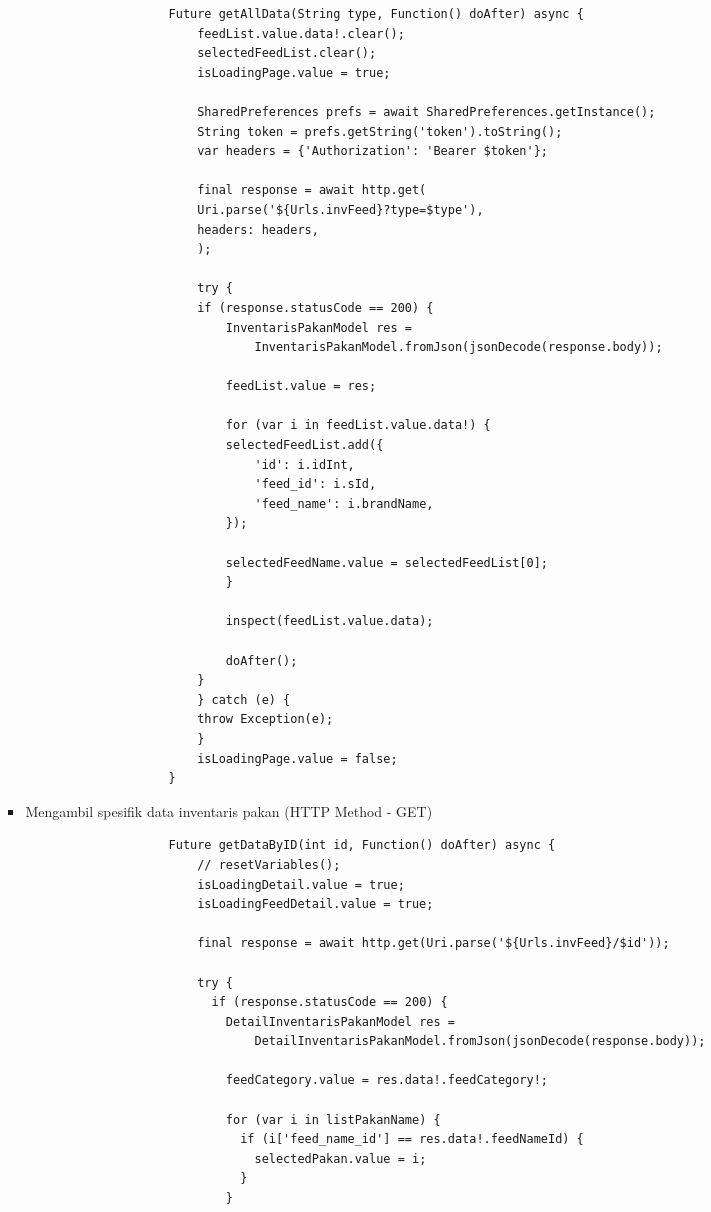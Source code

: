 \begin{spacing}{1.5}
\begin{enumerate}
\begin{enumerate}
\begin{itemize}
				\begin{lstlisting}
					Future getAllData(String type, Function() doAfter) async {
						feedList.value.data!.clear();
						selectedFeedList.clear();
						isLoadingPage.value = true;

						SharedPreferences prefs = await SharedPreferences.getInstance();
						String token = prefs.getString('token').toString();
						var headers = {'Authorization': 'Bearer $token'};

						final response = await http.get(
						Uri.parse('${Urls.invFeed}?type=$type'),
						headers: headers,
						);

						try {
						if (response.statusCode == 200) {
							InventarisPakanModel res =
								InventarisPakanModel.fromJson(jsonDecode(response.body));

							feedList.value = res;

							for (var i in feedList.value.data!) {
							selectedFeedList.add({
								'id': i.idInt,
								'feed_id': i.sId,
								'feed_name': i.brandName,
							});

							selectedFeedName.value = selectedFeedList[0];
							}

							inspect(feedList.value.data);

							doAfter();
						}
						} catch (e) {
						throw Exception(e);
						}
						isLoadingPage.value = false;
					}
				\end{lstlisting}

				\item Mengambil spesifik data inventaris pakan (HTTP Method - GET)
				
				\begin{lstlisting}
					Future getDataByID(int id, Function() doAfter) async {
						// resetVariables();
						isLoadingDetail.value = true;
						isLoadingFeedDetail.value = true;
					
						final response = await http.get(Uri.parse('${Urls.invFeed}/$id'));
					
						try {
						  if (response.statusCode == 200) {
							DetailInventarisPakanModel res =
								DetailInventarisPakanModel.fromJson(jsonDecode(response.body));
					
							feedCategory.value = res.data!.feedCategory!;
					
							for (var i in listPakanName) {
							  if (i['feed_name_id'] == res.data!.feedNameId) {
								selectedPakan.value = i;
							  }
							}
					

\end{lstlisting}
\end{itemize}
\end{enumerate}
\end{enumerate}
\end{spacing}
